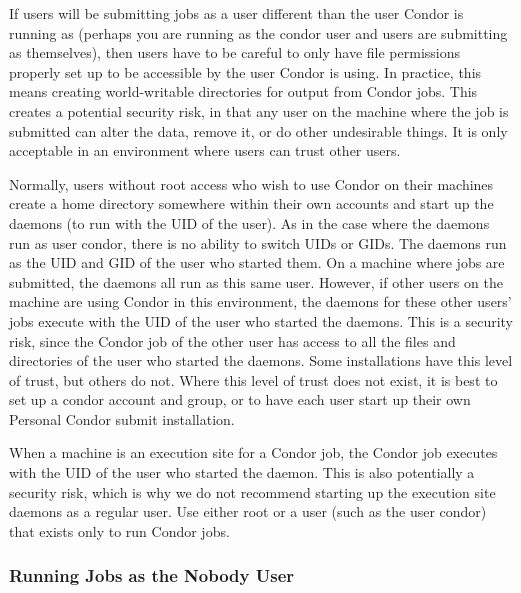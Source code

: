 If users will be submitting jobs as a user different than the user
Condor is running as (perhaps you are running as the condor user and
users are submitting as themselves), then users have to be careful to
only have file permissions properly set up to be accessible by the
user Condor is using. In practice, this means creating world-writable
directories for output from Condor jobs.  This creates a potential
security risk, in that any user on the machine where the job is
submitted can alter the data, remove it, or do other undesirable
things.  It is only acceptable in an environment where users can trust
other users.

Normally, users without root access who wish to use Condor on their
machines create a  home directory somewhere within their
own accounts and start up the daemons (to run with the UID of the
user).  As in the case where the daemons run as user condor, there is
no ability to switch UIDs or GIDs.  The daemons run as the UID and GID
of the user who started them.  On a machine where jobs are submitted,
the  daemons all run as this same user.  However, if
other users on the machine are using Condor in this environment, the
 daemons for these other users' jobs execute with the
UID of the user who started the daemons.  This is a security risk,
since the Condor job of the other user has access to all the files and
directories of the user who started the daemons.  Some installations
have this level of trust, but others do not.  Where this level of
trust does not exist, it is best to set up a condor account and group,
or to have each user start up their own Personal Condor submit
installation.

When a machine is an execution site for a Condor job, the Condor job
executes with the UID of the user who started the 
daemon.  This is also potentially a security risk, which is why we do
not recommend starting up the execution site daemons as a regular
user.  Use either root or a user (such as the user condor) that exists
only to run Condor jobs.

\subsubsection{\label{sec:RunAsNobody}Running Jobs as the Nobody User}

